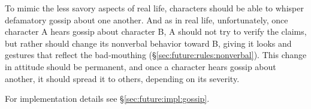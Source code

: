 To mimic the less savory aspects of real life, characters should be able to
whisper defamatory gossip about one another.
And as in real life, unfortunately, once character A hears gossip about
character B, A should not try to verify the claims, but rather should change
its nonverbal behavior toward B\@, giving it looks and gestures that
reflect the bad-mouthing (\S\ref{sec:future:rules:nonverbal}).
This change in attitude should be permanent, and once a character hears gossip
about another, it should spread it to others, depending on its severity.

For implementation details see \S\ref{sec:future:impl:gossip}.
